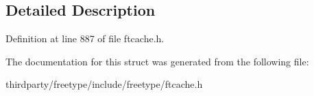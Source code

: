 \subsection{Detailed Description}


Definition at line 887 of file ftcache.\+h.



The documentation for this struct was generated from the following file\+:\begin{DoxyCompactItemize}
\item 
thirdparty/freetype/include/freetype/ftcache.\+h\end{DoxyCompactItemize}
